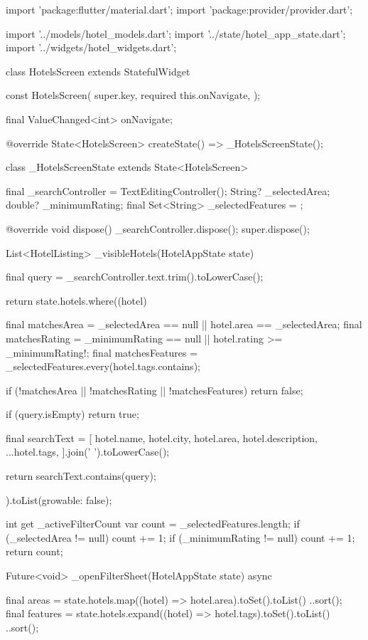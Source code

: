 \documentclass[11pt,a4paper]{article}
\begin{document}
\begin{codeblock}
import 'package:flutter/material.dart';
import 'package:provider/provider.dart';

import '../models/hotel_models.dart';
import '../state/hotel_app_state.dart';
import '../widgets/hotel_widgets.dart';

class HotelsScreen extends StatefulWidget {
  const HotelsScreen({
    super.key,
    required this.onNavigate,
  });

  final ValueChanged<int> onNavigate;

  @override
  State<HotelsScreen> createState() => _HotelsScreenState();
}

class _HotelsScreenState extends State<HotelsScreen> {
  final _searchController = TextEditingController();
  String? _selectedArea;
  double? _minimumRating;
  final Set<String> _selectedFeatures = {};

  @override
  void dispose() {
    _searchController.dispose();
    super.dispose();
  }

  List<HotelListing> _visibleHotels(HotelAppState state) {
    final query = _searchController.text.trim().toLowerCase();

    return state.hotels.where((hotel) {
      final matchesArea = _selectedArea == null || hotel.area == _selectedArea;
      final matchesRating =
          _minimumRating == null || hotel.rating >= _minimumRating!;
      final matchesFeatures = _selectedFeatures.every(hotel.tags.contains);

      if (!matchesArea || !matchesRating || !matchesFeatures) {
        return false;
      }

      if (query.isEmpty) {
        return true;
      }

      final searchText = [
        hotel.name,
        hotel.city,
        hotel.area,
        hotel.description,
        ...hotel.tags,
      ].join(' ').toLowerCase();

      return searchText.contains(query);
    }).toList(growable: false);
  }

  int get _activeFilterCount {
    var count = _selectedFeatures.length;
    if (_selectedArea != null) {
      count += 1;
    }
    if (_minimumRating != null) {
      count += 1;
    }
    return count;
  }

  Future<void> _openFilterSheet(HotelAppState state) async {
    final areas = state.hotels.map((hotel) => hotel.area).toSet().toList()
      ..sort();
    final features = state.hotels.expand((hotel) => hotel.tags).toSet().toList()
      ..sort();

}}
\end{codeblock}
\end{document}
